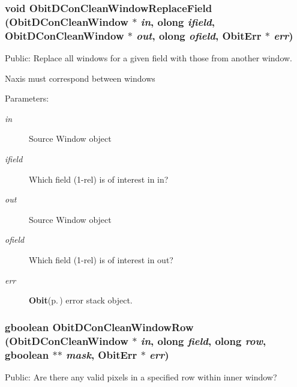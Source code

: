 \subsubsection{\setlength{\rightskip}{0pt plus 5cm}void Obit\-DCon\-Clean\-Window\-Replace\-Field ({\bf Obit\-DCon\-Clean\-Window} $\ast$ {\em in}, {\bf olong} {\em ifield}, {\bf Obit\-DCon\-Clean\-Window} $\ast$ {\em out}, {\bf olong} {\em ofield}, {\bf Obit\-Err} $\ast$ {\em err})}\label{ObitDConCleanWindow_8c_a31}


Public: Replace all windows for a given field with those from another window. 

Naxis must correspond between windows \begin{Desc}
\item[Parameters:]
\begin{description}
\item[{\em in}]Source Window object \item[{\em ifield}]Which field (1-rel) is of interest in in? \item[{\em out}]Source Window object \item[{\em ofield}]Which field (1-rel) is of interest in out? \item[{\em err}]{\bf Obit}{\rm (p.\,\pageref{structObit})} error stack object. \end{description}
\end{Desc}
\subsubsection{\setlength{\rightskip}{0pt plus 5cm}gboolean Obit\-DCon\-Clean\-Window\-Row ({\bf Obit\-DCon\-Clean\-Window} $\ast$ {\em in}, {\bf olong} {\em field}, {\bf olong} {\em row}, gboolean $\ast$$\ast$ {\em mask}, {\bf Obit\-Err} $\ast$ {\em err})}\label{ObitDConCleanWindow_8c_a24}


Public: Are there any valid pixels in a specified row within inner window? 

